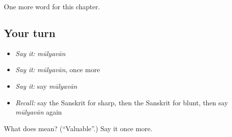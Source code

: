 \begin{grammarlens}[title={What you've built}]
One more word for this chapter.
\end{grammarlens}

\subsection*{Your turn}
\begin{itemize}
\raggedright
  \item \emph{Say it:} \emph{mūlyavān}
  \item \emph{Say it:} \emph{mūlyavān}, once more
  \item \emph{Say it:} say \emph{mūlyavān}
  \item \emph{Recall:} say the Sanskrit for sharp, then the Sanskrit for blunt, then say \emph{mūlyavān} again
\end{itemize}

\begin{tcolorbox}[breakable,colback=teal!4,colframe=teal!35!black,title={Before you move on}]
What does  mean? (\textquotedblleft{}Valuable\textquotedblright{}.) Say it once more.
\end{tcolorbox}
